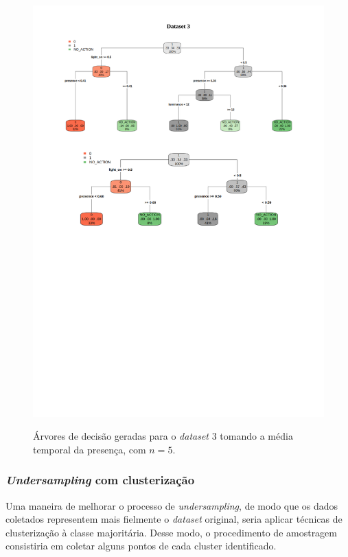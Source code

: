\begin{figure}[hp]
	\centering
	\caption{Árvores de decisão geradas para o \textit{dataset} 3 tomando a média temporal da presença, com $n=5$.}
  \includegraphics[width=\textwidth]{imagens/teste_learning/5_3.pdf}
  \label{fig:teste_5_3}  
\end{figure}

\clearpage

\subsubsection{\textit{Undersampling} com clusterização} \label{subsubsec:clusterization}
Uma maneira de melhorar o processo de \textit{undersampling}, de modo que os dados coletados representem mais fielmente o \textit{dataset} original, seria aplicar técnicas de clusterização à classe majoritária. Desse modo, o procedimento de amostragem consistiria em coletar alguns pontos de cada cluster identificado.

